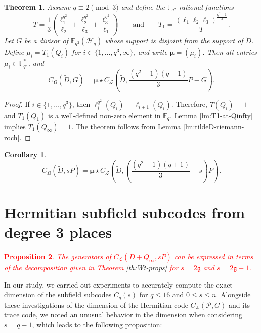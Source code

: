 \documentclass[11pt]{amsart}
\theoremstyle{plain}
\newtheorem{theorem}{Theorem}[section]
\newtheorem{proposition}[theorem]{Proposition}
\newtheorem*{corollary}{Corollary}
\theoremstyle{definition}
\theoremstyle{remark}
\newcommand{\g}{\mathfrak{g}}
\begin{document}
\begin{theorem}
Assume $q\equiv 2 \pmod3$ and define the $\mathbb{F}_{q^2}$-rational functions 
\[T=\frac{1}{3}\left(\frac{\ell_1^{q^2}}{\ell_2} + \frac{\ell_2^{q^2}}{\ell_3} + \frac{\ell_3^{q^2}}{\ell_1}\right) \qquad \text{and} \qquad T_1=\frac{(\ell_1\ell_{2}\ell_{3})^{\frac{q^2-1}{3}}}{T}.\]
Let $G$ be a divisor of $\mathbb{F}_{q^2}(\mathscr{H}_q)$ whose support is disjoint from the support of $\tilde{D}$. Define $\mu_i=T_1(Q_i)$ for $i \in \{1,\ldots,q^3,\infty\}$, and write $\boldsymbol{\mu}=(\mu_i)$. Then all entries $\mu_i\in \mathbb{F}_{q^2}^*$, and
\[C_\Omega(\tilde{D},G) = \boldsymbol{\mu} \star C_\mathscr{L}(\tilde{D},\frac{(q^2-1)(q+1)}{3}P-G).\]
\end{theorem}
\begin{proof}
If $i\in \{1,\ldots,q^3\}$, then $\ell_i^{q^2}(Q_i)=\ell_{i+1}(Q_i)$. Therefore, $T(Q_i)=1$ and $T_1(Q_1)$ is a well-defined non-zero element in $\mathbb{F}_q$. Lemma \ref{lm:T1-at-Qinfty} implies $T_1(Q_\infty)=1$. The theorem follows from Lemma \ref{lm:tildeD-riemann-roch}. 
\end{proof}

\begin{corollary}
\[C_\Omega(\tilde{D},sP) = \boldsymbol{\mu} \star C_\mathcal{L}\left(\tilde{D},\left(\frac{(q^2-1)(q+1)}{3}-s\right)P\right).\]
\end{corollary}



\section{Hermitian subfield subcodes from degree 3 places \label{sec:subf}}


\textcolor{red}{\begin{proposition}
	The generators of $C_{\mathcal{L}}\left(D+Q_{\infty}, s P\right)$ can be expressed in terms of the decomposition given in Theorem \ref{th:Wt-props} for $s=2 \g$ and $s=2 \g+1$.
\end{proposition}}

In our study, we carried out experiments to accurately compute the exact dimension of the subfield subcodes $ C_{q}(s) $ for $ q \leq 16 $ and $0 \leq s \leq n$. Alongside these investigations of the dimension of the Hermitian code $ C_{\mathcal{L}}(\mathcal{P}, G) $ and its trace code, we noted an unusual behavior in the dimension when considering $s = q - 1 $, which leads to the following proposition:
\end{document}
